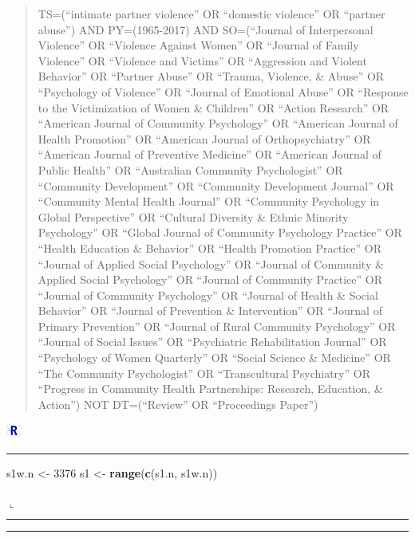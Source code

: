 \documentclass[]{tufte-handout}
\newenvironment{Shaded}{}{}
\newcommand{\KeywordTok}[1]{\textbf{{#1}}}
\newcommand{\DecValTok}[1]{{#1}}
\newcommand{\StringTok}[1]{{#1}}
\newcommand{\NormalTok}[1]{{#1}}
\newcommand{\Rrule}{
    \vspace*{1em}
    \noindent
    \hspace{-1em}
    \includegraphics[width=0.5cm]{auxDocs/Rlogo.png}
    \textcolor{Rblue}{
        \rule[0.1in]{0.90\linewidth}{0.02mm}
    }
    \vspace{-1.35em}
}
\newcommand{\Rerule}{
    \noindent
    \hspace{-1em}
    \textcolor{Rblue}{
        $\llcorner$\rule[-0.4mm]{\linewidth}{0.02mm}
    }
}
\begin{document}
\begin{quote}
TS=(``intimate partner violence'' OR ``domestic violence'' OR ``partner
abuse'') AND PY=(1965-2017) AND SO=(``Journal of Interpersonal
Violence'' OR ``Violence Against Women'' OR ``Journal of Family
Violence'' OR ``Violence and Victims'' OR ``Aggression and Violent
Behavior'' OR ``Partner Abuse'' OR ``Trauma, Violence, \& Abuse'' OR
``Psychology of Violence'' OR ``Journal of Emotional Abuse'' OR
``Response to the Victimization of Women \& Children'' OR ``Action
Research'' OR ``American Journal of Community Psychology'' OR ``American
Journal of Health Promotion'' OR ``American Journal of Orthopsychiatry''
OR ``American Journal of Preventive Medicine'' OR ``American Journal of
Public Health'' OR ``Australian Community Psychologist'' OR ``Community
Development'' OR ``Community Development Journal'' OR ``Community Mental
Health Journal'' OR ``Community Psychology in Global Perspective'' OR
``Cultural Diversity \& Ethnic Minority Psychology'' OR ``Global Journal
of Community Psychology Practice'' OR ``Health Education \& Behavior''
OR ``Health Promotion Practice'' OR ``Journal of Applied Social
Psychology'' OR ``Journal of Community \& Applied Social Psychology'' OR
``Journal of Community Practice'' OR ``Journal of Community Psychology''
OR ``Journal of Health \& Social Behavior'' OR ``Journal of Prevention
\& Intervention'' OR ``Journal of Primary Prevention'' OR ``Journal of
Rural Community Psychology'' OR ``Journal of Social Issues'' OR
``Psychiatric Rehabilitation Journal'' OR ``Psychology of Women
Quarterly'' OR ``Social Science \& Medicine'' OR ``The Community
Psychologist'' OR ``Transcultural Psychiatry'' OR ``Progress in
Community Health Partnerships: Research, Education, \& Action'') NOT
DT=(``Review'' OR ``Proceedings Paper'')
\end{quote}

\Rrule

\begin{Shaded}
\begin{Highlighting}[]
\NormalTok{s1w.n <-}\StringTok{ }\DecValTok{3376}
\NormalTok{s1 <-}\StringTok{ }\KeywordTok{range}\NormalTok{(}\KeywordTok{c}\NormalTok{(s1.n, s1w.n))}
\end{Highlighting}
\end{Shaded}

\Rerule

\begin{center}\rule{0.5\linewidth}{\linethickness}\end{center}
\end{document}
